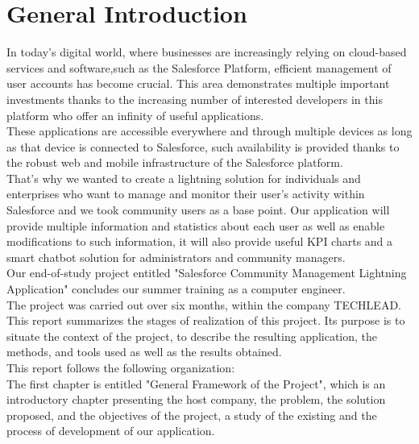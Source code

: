 
\chapter*{General Introduction}
%
In today's digital world, where businesses are increasingly relying on cloud-based services and software,such as the Salesforce Platform, efficient management of user accounts has become crucial. This area demonstrates
multiple important investments thanks to the increasing number of interested developers
in this platform who offer an infinity of useful applications.\\
These applications are accessible everywhere and through multiple devices as long as that device is connected to Salesforce, such availability is provided thanks to the robust web and mobile infrastructure of the Salesforce platform.\\
That's why we wanted to create a lightning solution for individuals and enterprises who want to manage and monitor their user's activity within Salesforce and we took community users as a base point. Our application will provide multiple information and statistics about each user as well as enable modifications to such information, it will also provide useful KPI charts and a smart chatbot solution for administrators and community managers.\\
Our end-of-study project entitled "Salesforce Community Management Lightning Application" concludes our summer training as a computer engineer.\\
The project was carried out over six months, within the company TECHLEAD. This report summarizes the stages of realization of this
project. Its purpose is to situate the context of the project, to describe the resulting application, the methods, and tools used as well as the results obtained.\\
This report follows the following organization:\\
The first chapter is entitled "General Framework of the Project", which is an introductory chapter presenting the host company, the problem, the solution
proposed, and the objectives of the project, a study of the existing and the process of
development of our application.\\
